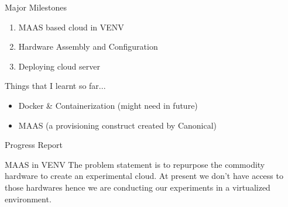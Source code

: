 \begin{frame}{Major Milestones}
    \begin{enumerate}
        \item MAAS based cloud in VENV
        \item Hardware Assembly and Configuration
        \item Deploying cloud server
    \end{enumerate}
\end{frame}

\begin{frame}{Things that I learnt so far...}
    \begin{itemize}
        \item Docker \& Containerization (might need in future)
        \item MAAS (a provisioning construct created by Canonical)
    \end{itemize}
\end{frame}

\begin{frame}{Progress Report}
    \begin{block}{MAAS in VENV}
        The problem statement is to repurpose the commodity hardware to create an experimental cloud. At present we don't have access to those hardwares hence we are conducting our experiments in a virtualized environment.
    \end{block}
\end{frame}
